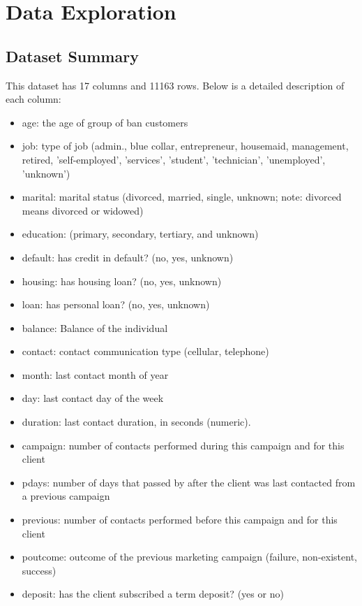 \documentclass[12pt]{article}
\begin{document}
\section{Data Exploration}
\subsection{Dataset Summary}
This dataset has 17 columns and 11163 rows. Below is a detailed description of each column: 

\begin{itemize}

\item age: the age of group of ban customers
\item	job: type of job (admin., blue collar, entrepreneur, housemaid, management, retired, 'self-employed', 'services', 'student', 'technician', 'unemployed', 'unknown')
\item	marital: marital status (divorced, married, single, unknown; note: divorced means divorced or widowed)
\item	education: (primary, secondary, tertiary, and unknown)
\item	default: has credit in default? (no, yes, unknown)
\item	housing: has housing loan? (no, yes, unknown)
\item	loan: has personal loan? (no, yes, unknown)
\item	balance: Balance of the individual
\item	contact: contact communication type (cellular, telephone)
\item	month: last contact month of year 
\item	day: last contact day of the week 
\item	duration: last contact duration, in seconds (numeric). 
\item	campaign: number of contacts performed during this campaign and for this client 
\item pdays: number of days that passed by after the client was last contacted from a previous campaign 
\item	previous: number of contacts performed before this campaign and for this client 
\item poutcome: outcome of the previous marketing campaign (failure, non-existent, success)
\item	deposit: has the client subscribed a term deposit? (yes or no)
\end{itemize}
\end{document}
